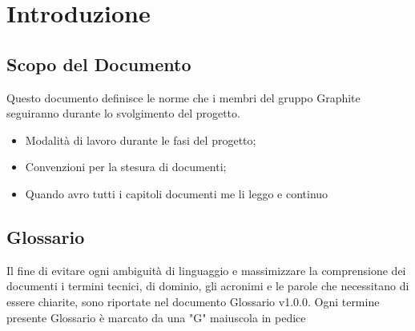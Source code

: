 \documentclass[./NormediProgetto.tex]{subfiles}
\begin{document}
	
\chapter{Introduzione}
\section{Scopo del Documento}
Questo documento definisce le norme che i membri del gruppo Graphite seguiranno durante lo svolgimento del progetto.
\begin{itemize}
\item Modalità di lavoro durante le fasi del progetto;
\item Convenzioni per la stesura di documenti;
\item Quando avro tutti i capitoli documenti me li leggo e continuo

\end{itemize}
\section{Glossario}
Il fine di evitare ogni ambiguità di linguaggio e massimizzare la comprensione dei documenti i termini tecnici, di dominio, gli acronimi e le parole che necessitano di essere chiarite, sono riportate nel documento Glossario v1.0.0.
Ogni termine presente Glossario è marcato da una "G" maiuscola in pedice
\end{document}
